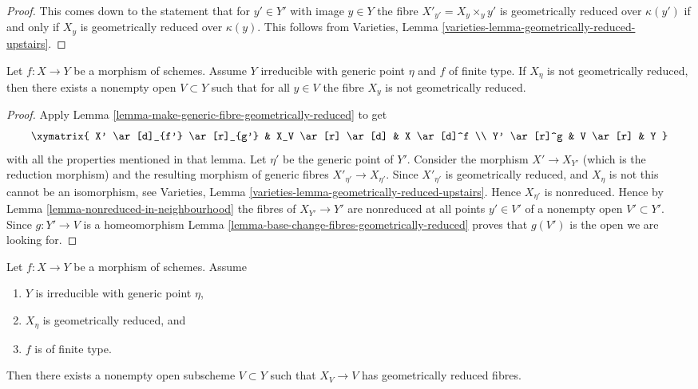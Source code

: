 \begin{proof}
This comes down to the statement that for $y' \in Y'$ with image
$y \in Y$ the fibre $X'_{y'} = X_y \times_y y'$ is geometrically
reduced over $\kappa(y')$ if and only if $X_y$ is geometrically
reduced over $\kappa(y)$. This follows from
Varieties, Lemma \ref{varieties-lemma-geometrically-reduced-upstairs}.
\end{proof}

\begin{lemma}
\label{lemma-not-geometrically-reduced-in-neighbourhood}
Let $f : X \to Y$ be a morphism of schemes. Assume $Y$ irreducible with
generic point $\eta$ and $f$ of finite type. If $X_\eta$ is not
geometrically reduced, then there exists a nonempty open $V \subset Y$
such that for all $y \in V$ the fibre $X_y$ is not geometrically reduced.
\end{lemma}

\begin{proof}
Apply
Lemma \ref{lemma-make-generic-fibre-geometrically-reduced}
to get
$$
\xymatrix{
X' \ar[d]_{f'} \ar[r]_{g'} & X_V \ar[r] \ar[d] & X \ar[d]^f \\
Y' \ar[r]^g & V \ar[r] & Y
}
$$
with all the properties mentioned in that lemma.
Let $\eta'$ be the generic point of $Y'$.
Consider the morphism $X' \to X_{Y'}$ (which is the reduction
morphism) and the resulting morphism of generic fibres
$X'_{\eta'} \to X_{\eta'}$.
Since $X'_{\eta'}$ is geometrically reduced, and $X_\eta$
is not this cannot be an isomorphism, see
Varieties, Lemma \ref{varieties-lemma-geometrically-reduced-upstairs}.
Hence $X_{\eta'}$ is nonreduced. Hence by
Lemma \ref{lemma-nonreduced-in-neighbourhood}
the fibres of $X_{Y'} \to Y'$ are nonreduced at all points $y' \in V'$
of a nonempty open $V' \subset Y'$. Since $g : Y' \to V$ is a homeomorphism
Lemma \ref{lemma-base-change-fibres-geometrically-reduced}
proves that $g(V')$ is the open we are looking for.
\end{proof}

\begin{lemma}
\label{lemma-geometrically-reduced-generic-fibre}
Let $f : X \to Y$ be a morphism of schemes.
Assume
\begin{enumerate}
\item $Y$ is irreducible with generic point $\eta$,
\item $X_\eta$ is geometrically reduced, and
\item $f$ is of finite type.
\end{enumerate}
Then there exists a nonempty open subscheme $V \subset Y$
such that $X_V \to V$ has geometrically reduced fibres.
\end{lemma}

